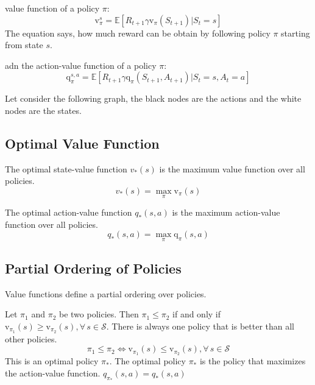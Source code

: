 value function of a policy $\pi$:
\[
    \text{v}_{\pi}^{s}=\mathbb{E}[R_{t+1}\gamma\text{v}_{\pi}(S_{t+1})|S_t=s]
\]
The equation says, how much reward can be obtain by following policy $\pi$ starting from state $s$.

adn the action-value function of a policy $\pi$:
\[
    \text{q}_{\pi}^{s,a}=\mathbb{E}[R_{t+1}\gamma\text{q}_{\pi}(S_{t+1},A_{t+1})|S_t=s,A_t=a]
\]

Let consider the following graph, the black nodes are the
actions and the white nodes are the states.
\begin{center}
\end{center}


\subsection{Optimal Value Function}\label{subsec:optimal-value-function}
The optimal state-value function $v_{*}(s)$ is the maximum value function over all policies.
\[
    v_{*}(s) = \max_{\pi}\text{v}_{\pi}(s)
\]

The optimal action-value function $q_{*}(s,a)$ is the maximum action-value function over all policies.
\[
    q_{*}(s,a) = \max_{\pi}\text{q}_{\pi}(s,a)
\]

\subsection{Partial Ordering of Policies}\label{subsec:partial-ordering-of-policies}
Value functions define a partial ordering over policies.

\begin{definition}
    \label{def:partial-ordering-of-policies}
    Let $\pi_1$ and $\pi_2$ be two policies.
    Then $\pi_1\leq\pi_2$ if and only if $\text{v}_{\pi_1}(s)\geq\text{v}_{\pi_2}(s),\forall\,s\in\mathcal{S}$.
    There is always one policy that is better than all other policies.
    \[
        \pi_1\leq\pi_2\iff\text{v}_{\pi_1}(s)\leq\text{v}_{\pi_2}(s),\forall\,s\in\mathcal{S}
    \]
    This is an optimal policy $\pi_{*}$.
    The optimal policy $\pi_{*}$ is the policy that maximizes the action-value function.
    $q_{\pi_{*}}(s,a) = q_*(s,a)$
\end{definition}\cite[p.~84]{sutton-2018}

